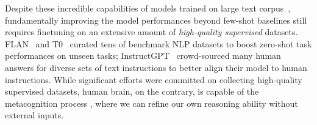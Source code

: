 \documentclass{article} %
\begin{document}
Despite these incredible capabilities of models trained on large text corpus~\citep{Brown2020LanguageMA,Chowdhery2022PaLMSL}, fundamentally improving the model performances beyond few-shot baselines still requires finetuning on an extensive amount of \textit{high-quality supervised} datasets. FLAN~\citep{wei2021finetuned,chung2022scaling} and T0~\citep{sanh2021multitask} curated tens of benchmark NLP datasets to boost zero-shot task performances on unseen tasks; InstructGPT~\citep{ouyang2022training} crowd-sourced many human answers for diverse sets of text instructions to better align their model to human instructions. %
While significant efforts were committed on collecting high-quality supervised datasets, human brain, on the contrary, is capable of the metacognition process \citep{dunlosky2008metacognition}, where we can refine our own reasoning ability without external inputs. %
\end{document}
